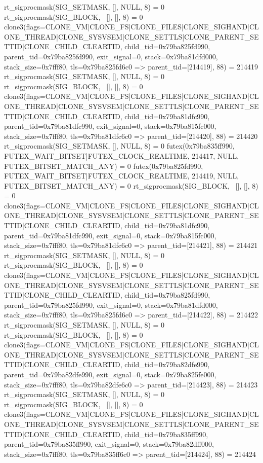 \begin{breakableverbatim}
rt_sigprocmask(SIG_SETMASK, [], NULL, 8) = 0
rt_sigprocmask(SIG_BLOCK, ~[], [], 8)   = 0
clone3({flags=CLONE_VM|CLONE_FS|CLONE_FILES|CLONE_SIGHAND|CLONE_THREAD|CLONE_SYSVSEM|CLONE_SETTLS|CLONE_PARENT_SETTID|CLONE_CHILD_CLEARTID, child_tid=0x79ba825fd990, parent_tid=0x79ba825fd990, exit_signal=0, stack=0x79ba81dfd000, stack_size=0x7fff80, tls=0x79ba825fd6c0} => {parent_tid=[214419]}, 88) = 214419
rt_sigprocmask(SIG_SETMASK, [], NULL, 8) = 0
rt_sigprocmask(SIG_BLOCK, ~[], [], 8)   = 0
clone3({flags=CLONE_VM|CLONE_FS|CLONE_FILES|CLONE_SIGHAND|CLONE_THREAD|CLONE_SYSVSEM|CLONE_SETTLS|CLONE_PARENT_SETTID|CLONE_CHILD_CLEARTID, child_tid=0x79ba81dfc990, parent_tid=0x79ba81dfc990, exit_signal=0, stack=0x79ba815fc000, stack_size=0x7fff80, tls=0x79ba81dfc6c0} => {parent_tid=[214420]}, 88) = 214420
rt_sigprocmask(SIG_SETMASK, [], NULL, 8) = 0
futex(0x79ba835ff990, FUTEX_WAIT_BITSET|FUTEX_CLOCK_REALTIME, 214417, NULL, FUTEX_BITSET_MATCH_ANY) = 0
futex(0x79ba825fd990, FUTEX_WAIT_BITSET|FUTEX_CLOCK_REALTIME, 214419, NULL, FUTEX_BITSET_MATCH_ANY) = 0
rt_sigprocmask(SIG_BLOCK, ~[], [], 8)   = 0
clone3({flags=CLONE_VM|CLONE_FS|CLONE_FILES|CLONE_SIGHAND|CLONE_THREAD|CLONE_SYSVSEM|CLONE_SETTLS|CLONE_PARENT_SETTID|CLONE_CHILD_CLEARTID, child_tid=0x79ba81dfc990, parent_tid=0x79ba81dfc990, exit_signal=0, stack=0x79ba815fc000, stack_size=0x7fff80, tls=0x79ba81dfc6c0} => {parent_tid=[214421]}, 88) = 214421
rt_sigprocmask(SIG_SETMASK, [], NULL, 8) = 0
rt_sigprocmask(SIG_BLOCK, ~[], [], 8)   = 0
clone3({flags=CLONE_VM|CLONE_FS|CLONE_FILES|CLONE_SIGHAND|CLONE_THREAD|CLONE_SYSVSEM|CLONE_SETTLS|CLONE_PARENT_SETTID|CLONE_CHILD_CLEARTID, child_tid=0x79ba825fd990, parent_tid=0x79ba825fd990, exit_signal=0, stack=0x79ba81dfd000, stack_size=0x7fff80, tls=0x79ba825fd6c0} => {parent_tid=[214422]}, 88) = 214422
rt_sigprocmask(SIG_SETMASK, [], NULL, 8) = 0
rt_sigprocmask(SIG_BLOCK, ~[], [], 8)   = 0
clone3({flags=CLONE_VM|CLONE_FS|CLONE_FILES|CLONE_SIGHAND|CLONE_THREAD|CLONE_SYSVSEM|CLONE_SETTLS|CLONE_PARENT_SETTID|CLONE_CHILD_CLEARTID, child_tid=0x79ba82dfe990, parent_tid=0x79ba82dfe990, exit_signal=0, stack=0x79ba825fe000, stack_size=0x7fff80, tls=0x79ba82dfe6c0} => {parent_tid=[214423]}, 88) = 214423
rt_sigprocmask(SIG_SETMASK, [], NULL, 8) = 0
rt_sigprocmask(SIG_BLOCK, ~[], [], 8)   = 0
clone3({flags=CLONE_VM|CLONE_FS|CLONE_FILES|CLONE_SIGHAND|CLONE_THREAD|CLONE_SYSVSEM|CLONE_SETTLS|CLONE_PARENT_SETTID|CLONE_CHILD_CLEARTID, child_tid=0x79ba835ff990, parent_tid=0x79ba835ff990, exit_signal=0, stack=0x79ba82dff000, stack_size=0x7fff80, tls=0x79ba835ff6c0} => {parent_tid=[214424]}, 88) = 214424

\end{breakableverbatim}
